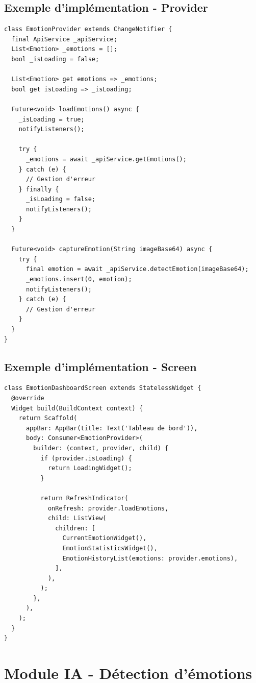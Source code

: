 \documentclass[a4paper,11pt]{report}
\begin{document}
\subsection{Exemple d'implémentation - Provider}

\begin{lstlisting}[style=dart, caption=Exemple de Provider pour gestion d'état]
class EmotionProvider extends ChangeNotifier {
  final ApiService _apiService;
  List<Emotion> _emotions = [];
  bool _isLoading = false;
  
  List<Emotion> get emotions => _emotions;
  bool get isLoading => _isLoading;
  
  Future<void> loadEmotions() async {
    _isLoading = true;
    notifyListeners();
    
    try {
      _emotions = await _apiService.getEmotions();
    } catch (e) {
      // Gestion d'erreur
    } finally {
      _isLoading = false;
      notifyListeners();
    }
  }
  
  Future<void> captureEmotion(String imageBase64) async {
    try {
      final emotion = await _apiService.detectEmotion(imageBase64);
      _emotions.insert(0, emotion);
      notifyListeners();
    } catch (e) {
      // Gestion d'erreur
    }
  }
}
\end{lstlisting}

\subsection{Exemple d'implémentation - Screen}

\begin{lstlisting}[style=dart, caption=Exemple d'écran Flutter]
class EmotionDashboardScreen extends StatelessWidget {
  @override
  Widget build(BuildContext context) {
    return Scaffold(
      appBar: AppBar(title: Text('Tableau de bord')),
      body: Consumer<EmotionProvider>(
        builder: (context, provider, child) {
          if (provider.isLoading) {
            return LoadingWidget();
          }
          
          return RefreshIndicator(
            onRefresh: provider.loadEmotions,
            child: ListView(
              children: [
                CurrentEmotionWidget(),
                EmotionStatisticsWidget(),
                EmotionHistoryList(emotions: provider.emotions),
              ],
            ),
          );
        },
      ),
    );
  }
}
\end{lstlisting}

\section{Module IA - Détection d'émotions}
\end{document}
